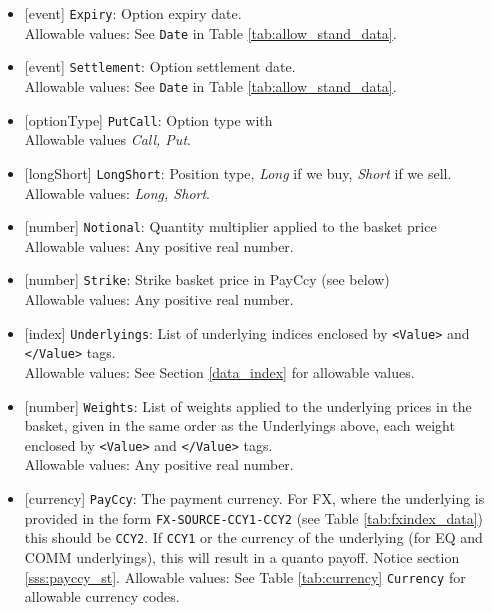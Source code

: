 \begin{itemize}
    \item{}[event] \lstinline!Expiry!: Option expiry date. \\
    Allowable values: See \lstinline!Date! in Table \ref{tab:allow_stand_data}.
    \item{}[event] \lstinline!Settlement!: Option settlement date. \\
    Allowable values: See \lstinline!Date! in Table \ref{tab:allow_stand_data}.
    \item{}[optionType] \lstinline!PutCall!: Option type with \\
          Allowable values \emph{Call, Put}.
    \item{}[longShort] \lstinline!LongShort!: Position type,
          {\em Long} if we buy, {\em Short} if we sell.\\
    Allowable values: \emph{Long, Short}.
     \item{}[number] \lstinline!Notional!: Quantity multiplier applied to the basket price \\
          Allowable values: Any positive real number.
     \item{}[number] \lstinline!Strike!: Strike basket price in PayCcy (see below) \\
          Allowable values: Any positive real number.
     \item{}[index] \lstinline!Underlyings!:
          List of underlying indices enclosed by {\tt <Value>} and {\tt </Value>} tags. \\
          Allowable values: See Section \ref{data_index} for allowable values.
    \item{}[number] \lstinline!Weights!: List of weights applied to the
      underlying prices in the basket, given in the same order as
      the Underlyings above, each weight enclosed by {\tt <Value>} and {\tt </Value>} tags.\\
      Allowable values: Any positive real number.
    \item{}[currency] \lstinline!PayCcy!: The payment currency. For FX, where the underlying is provided
    in the form \lstinline!FX-SOURCE-CCY1-CCY2! (see Table \ref{tab:fxindex_data}) this should
    be \lstinline!CCY2!. If \lstinline!CCY1! or the currency of the underlying (for EQ and
    COMM underlyings), this will result in a quanto payoff. Notice section \ref{sss:payccy_st}.
      Allowable values: See Table \ref{tab:currency} \lstinline!Currency!
      for allowable currency codes.
\end{itemize}

